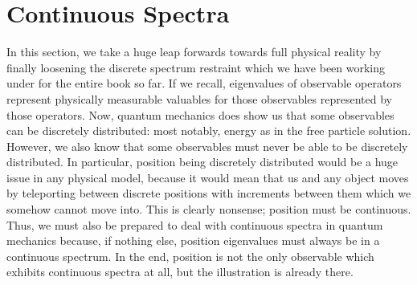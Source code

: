 \chapter{Continuous Spectra}
In this section, we take a huge leap forwards towards full physical reality by finally loosening the discrete spectrum restraint which we have been working under for the entire book so far. If we recall, eigenvalues of observable operators represent physically measurable valuables for those observables represented by those operators. Now, quantum mechanics does show us that some observables can be discretely distributed: most notably, energy as in the free particle solution. However, we also know that some observables must never be able to be discretely distributed. In particular, position being discretely distributed would be a huge issue in any physical model, because it would mean that us and any object moves by teleporting between discrete positions with increments between them which we somehow cannot move into. This is clearly nonsense; position must be continuous. Thus, we must also be prepared to deal with continuous spectra in quantum mechanics because, if nothing else, position eigenvalues must always be in a continuous spectrum. In the end, position is not the only observable which exhibits continuous spectra at all, but the illustration is already there.

